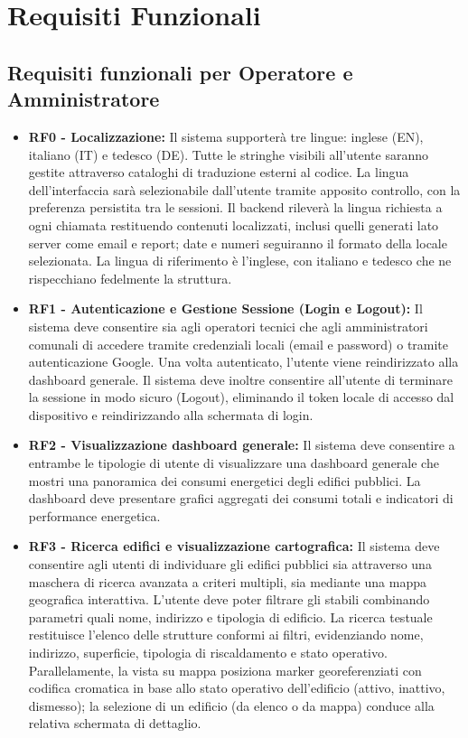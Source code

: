 \section{Requisiti Funzionali}

\subsection{Requisiti funzionali per Operatore e Amministratore}
\begin{itemize}
    \item \textbf{RF0 - Localizzazione:} Il sistema supporterà tre lingue: inglese (EN), italiano (IT) e tedesco (DE). Tutte le stringhe visibili all'utente saranno gestite attraverso cataloghi di traduzione esterni al codice. La lingua dell'interfaccia sarà selezionabile dall'utente tramite apposito controllo, con la preferenza persistita tra le sessioni. Il backend rileverà la lingua richiesta a ogni chiamata restituendo contenuti localizzati, inclusi quelli generati lato server come email e report; date e numeri seguiranno il formato della locale selezionata. La lingua di riferimento è l'inglese, con italiano e tedesco che ne rispecchiano fedelmente la struttura.
    
    \item \textbf{RF1 - Autenticazione e Gestione Sessione (Login e Logout):} Il sistema deve consentire sia agli operatori tecnici che agli amministratori comunali di accedere tramite credenziali locali (email e password) o tramite autenticazione Google. Una volta autenticato, l'utente viene reindirizzato alla dashboard generale. Il sistema deve inoltre consentire all'utente di terminare la sessione in modo sicuro (Logout), eliminando il token locale di accesso dal dispositivo e reindirizzando alla schermata di login.

    \item \textbf{RF2 - Visualizzazione dashboard generale:} Il sistema deve consentire a entrambe le tipologie di utente di visualizzare una dashboard generale che mostri una panoramica dei consumi energetici degli edifici pubblici. La dashboard deve presentare grafici aggregati dei consumi totali e indicatori di performance energetica. 

    \item \textbf{RF3 - Ricerca edifici e visualizzazione cartografica:} Il sistema deve consentire agli utenti di individuare gli edifici pubblici sia attraverso una maschera di ricerca avanzata a criteri multipli, sia mediante una mappa geografica interattiva. L'utente deve poter filtrare gli stabili combinando parametri quali nome, indirizzo e tipologia di edificio. La ricerca testuale restituisce l'elenco delle strutture conformi ai filtri, evidenziando nome, indirizzo, superficie, tipologia di riscaldamento e stato operativo. Parallelamente, la vista su mappa posiziona marker georeferenziati con codifica cromatica in base allo stato operativo dell'edificio (attivo, inattivo, dismesso); la selezione di un edificio (da elenco o da mappa) conduce alla relativa schermata di dettaglio.
    

\end{itemize}
